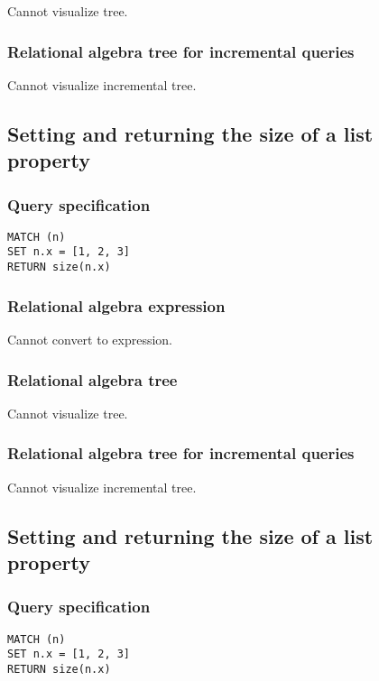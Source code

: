 Cannot visualize tree.

\subsubsection*{Relational algebra tree for incremental queries}

Cannot visualize incremental tree.

\subsection{Setting and returning the size of a list property}

\subsubsection*{Query specification}

\begin{lstlisting}
MATCH (n)
SET n.x = [1, 2, 3]
RETURN size(n.x)
\end{lstlisting}

\subsubsection*{Relational algebra expression}

Cannot convert to expression.

\subsubsection*{Relational algebra tree}

Cannot visualize tree.

\subsubsection*{Relational algebra tree for incremental queries}

Cannot visualize incremental tree.

\subsection{Setting and returning the size of a list property}

\subsubsection*{Query specification}

\begin{lstlisting}
MATCH (n)
SET n.x = [1, 2, 3]
RETURN size(n.x)
\end{lstlisting}

